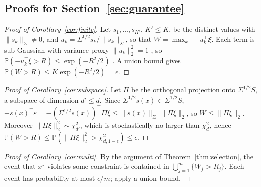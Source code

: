 
\subsection{Proofs for Section~\ref{sec:guarantee}}

\begin{proof}[Proof of Corollary~\ref{cor:finite}]
Let $s_1,\dots,s_{K'}$, $K' \le K$, be the distinct values with
$\|s_k\|_\Sigma \neq 0$, and $u_k = \Sigma^{1/2}s_k / \|s_k\|_\Sigma$, so that
$W = \max_k \, -u_k^\top\xi$. Each term is sub-Gaussian with variance proxy
$\|u_k\|_2^2 = 1$ \citep[Proposition~15.2]{bertsimas2022robust}, so
$\mathbb{P}(-u_k^\top\xi > R) \le \exp(-R^2/2)$
\citep[Proposition~15.1]{bertsimas2022robust}. A union bound gives
$\mathbb{P}(W > R) \le K\exp(-R^2/2) = \epsilon$.
\end{proof}

\begin{proof}[Proof of Corollary~\ref{cor:subspace}]
Let $\Pi$ be the orthogonal projection onto $\Sigma^{1/2}S$, a subspace of
dimension $d' \le d$. Since $\Sigma^{1/2}s(x) \in \Sigma^{1/2}S$,
$-s(x)^\top\varepsilon = -(\Sigma^{1/2}s(x))^\top \Pi\xi
\le \|s(x)\|_\Sigma\,\|\Pi\xi\|_2$, so $W \le \|\Pi\xi\|_2$. Moreover
$\|\Pi\xi\|_2^2 \sim \chi^2_{d'}$, which is stochastically no larger than
$\chi^2_d$, hence
$\mathbb{P}(W > R) \le \mathbb{P}(\|\Pi\xi\|_2^2 > \chi^2_{d,1-\epsilon})
\le \epsilon$.
\end{proof}

\begin{proof}[Proof of Corollary~\ref{cor:multi}]
By the argument of Theorem~\ref{thm:selection}, the event that $x^\star$
violates some constraint is contained in $\bigcup_{j=1}^m \{W_j > R_j\}$.
Each event has probability at most $\epsilon/m$; apply a union bound.
\end{proof}

